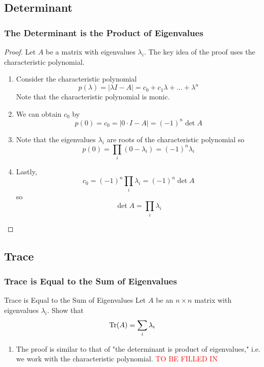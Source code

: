\documentclass[../main]{subfiles}
\begin{document}
\subsection{Determinant}
\subsubsection{The Determinant is the Product of Eigenvalues}
\begin{proof}
    Let $A$ be a matrix with eigenvalues $\lambda_i$. The key idea of the proof uses the characteristic polynomial.
    \begin{enumerate}
        \item Consider the characteristic polynomial
        \[
        p(\lambda) = |\lambda I - A| = c_0 + c_1 \lambda + \dots + \lambda^n
        \]
        Note that the characteristic polynomial is monic.
        \item We can obtain $c_0$ by
        \[
        p(0) = c_0 = |0\cdot I - A| = (-1)^n \det A
        \]
        \item Note that the eigenvalues $\lambda_i$ are roots of the characteristic polynomial so 
        \[
        p(0) = \prod_i(0-\lambda_i) = (-1)^n \lambda_i
        \]
        \item Lastly, 
        \[
        c_0 = (-1)^n \prod_{i}\lambda_i  = (-1)^n \det A
        \]
        so 
        \[
        \det A = \prod_i \lambda_i
        \]
    \end{enumerate}
\end{proof}
\subsection{Trace}
\subsubsection{Trace is Equal to the Sum of Eigenvalues}
\begin{bbox}{Trace is Equal to the Sum of Eigenvalues}
    Let $A$ be an $n\times n$ matrix with eigenvalues $\lambda_i$. Show that 
    \[
    \Tr(A) = \sum_i \lambda_i
    \]
\end{bbox}
\begin{solution}
    \begin{enumerate}
        \item The proof is similar to that of "the determinant is product of eigenvalues," i.e. we work with the characteristic polynomial. \textcolor{red}{TO BE FILLED IN} 
    \end{enumerate}
\end{solution}
\end{document}
